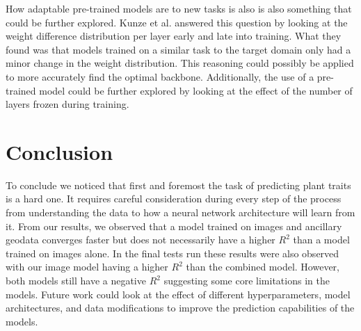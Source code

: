 \documentclass[12pt,a4paper,oneside]{article}
\begin{document}
How adaptable pre-trained models are to new tasks is also is also something that could be further explored. Kunze et al. \cite{kunze2017transfer} answered this question by looking at the weight difference distribution per layer early and late into training. What they found was that models trained on a similar task to the target domain only had a minor change in the weight distribution. This reasoning could possibly be applied to more accurately find the optimal backbone. Additionally, the use of a pre-trained model could be further explored by looking at the effect of the number of layers frozen during training. 

\section{Conclusion}
To conclude we noticed that first and foremost the task of predicting plant traits is a hard one. It requires careful consideration during every step of the process from understanding the data to how a neural network architecture will learn from it. From our results, we observed that a model trained on images and ancillary geodata converges faster but does not necessarily have a higher $R^2$ than a model trained on images alone. In the final tests run these results were also observed with our image model having a higher $R^2$ than the combined model. However, both models still have a negative $R^2$ suggesting some core limitations in the models. Future work could look at the effect of different hyperparameters, model architectures, and data modifications to improve the prediction capabilities of the models.   

\printbibliography
\end{document}
